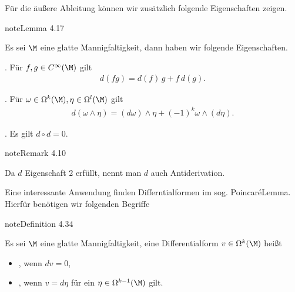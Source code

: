 \documentclass[letterpaper,10pt,german]{jupyterBook}
\begin{document}
\sphinxAtStartPar
Für die äußere Ableitung können wir zusätzlich folgende Eigenschaften zeigen.
\label{manifolds/diffformen:lem:outeprop}
\begin{sphinxadmonition}{note}{Lemma 4.17}



\sphinxAtStartPar
Es sei \(\M\) eine glatte Mannigfaltigkeit, dann haben wir folgende Eigenschaften.



. Für \(f,g\in C^\infty(\M)\) gilt
\begin{equation*}
\begin{split}d(fg) = d(f)\,g + f\, d(g).\end{split}
\end{equation*}


. Für \(\omega\in\Omega^k(\M),\eta\in\Omega^l(\M)\) gilt
\begin{equation*}
\begin{split}d(\omega\wedge\eta) = (d\omega)\wedge \eta + (-1)^k \omega\wedge (d\eta).\end{split}
\end{equation*}


. Es gilt \(d\circ d = 0\).
\end{sphinxadmonition}
\label{manifolds/diffformen:remark-9}
\begin{sphinxadmonition}{note}{Remark 4.10}



\sphinxAtStartPar
Da \(d\) Eigenschaft 2 erfüllt, nennt man \(d\) auch Antiderivation.
\end{sphinxadmonition}

\sphinxAtStartPar
Eine interessante Anwendung finden Differntialformen im sog. Poincaré\sphinxhyphen{}Lemma. Hierfür benötigen wir folgenden Begriffe
\label{manifolds/diffformen:def:geschlossenexakt}
\begin{sphinxadmonition}{note}{Definition 4.34}



\sphinxAtStartPar
Es sei \(\M\) eine glatte Mannigfaltigkeit, eine Differentialform \(v\in\Omega^k(\M)\) heißt
\begin{itemize}
\item {} 
\sphinxAtStartPar
{}, wenn \(dv=0\),

\item {} 
\sphinxAtStartPar
{}, wenn \(v=d\eta\) für ein \(\eta\in\Omega^{k-1}(\M)\) gilt.

\end{itemize}
\end{sphinxadmonition}
\end{document}
